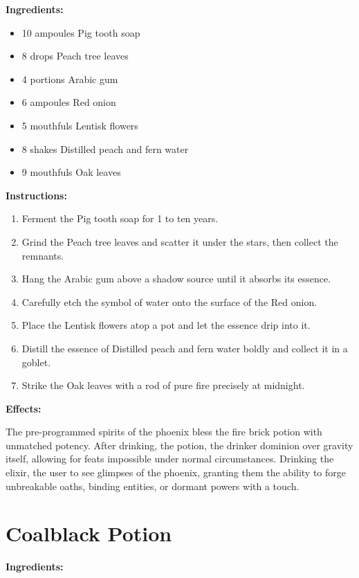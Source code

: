 \documentclass{article}
\begin{document}
\textbf{Ingredients:}

\begin{itemize}
  \item 10 ampoules Pig tooth soap
  \item 8 drops Peach tree leaves
  \item 4 portions Arabic gum
  \item 6 ampoules Red onion
  \item 5 mouthfuls Lentisk flowers
  \item 8 shakes Distilled peach and fern water
  \item 9 mouthfuls Oak leaves
\end{itemize}

\textbf{Instructions:}

\begin{enumerate}
  \item Ferment the Pig tooth soap for 1 to ten years.
  \item Grind the Peach tree leaves and scatter it under the stars, then collect the remnants.
  \item Hang the Arabic gum above a shadow source until it absorbs its essence.
  \item Carefully etch the symbol of water onto the surface of the Red onion.
  \item Place the Lentisk flowers atop a pot and let the essence drip into it.
  \item Distill the essence of Distilled peach and fern water boldly and collect it in a goblet.
  \item Strike the Oak leaves with a rod of pure fire precisely at midnight.
\end{enumerate}

\textbf{Effects:}

The pre-programmed spirits of the phoenix bless the fire brick potion with unmatched potency. After drinking, the potion, the drinker dominion over gravity itself, allowing for feats impossible under normal circumstances. Drinking the elixir, the user to see glimpses of the phoenix, granting them the ability to forge unbreakable oaths, binding entities, or dormant powers with a touch.

\newpage
\section*{Coalblack Potion}

\textbf{Ingredients:}
\end{document}
